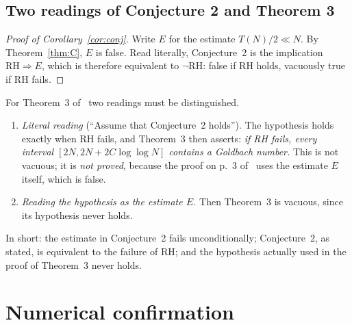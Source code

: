 \documentclass[11pt]{amsart}
\theoremstyle{definition}
\theoremstyle{remark}
\numberwithin{equation}{section}
\newcommand{\Ca}{\cite{Ca}}
\begin{document}
\subsection{Two readings of Conjecture 2 and Theorem 3}\label{sec:readings}
\begin{proof}[Proof of Corollary~\ref{cor:conj}]
Write $E$ for the estimate $T(N)/2\ll N$. By Theorem~\ref{thm:C}, $E$ is false. Read
literally, Conjecture~2 is the implication $\mathrm{RH}\Rightarrow E$, which is therefore
equivalent to $\neg\mathrm{RH}$: false if RH holds, vacuously true if RH fails.
\end{proof}

For Theorem~3 of~\Ca{} two readings must be distinguished.
\begin{enumerate}[label=(\alph*)]
\item \emph{Literal reading} (``Assume that Conjecture~2 holds''). The hypothesis holds
  exactly when RH fails, and Theorem~3 then asserts: \emph{if RH fails, every interval
  $[2N,2N+2C\log\log N]$ contains a Goldbach number.} This is not vacuous; it is
  \emph{not proved}, because the proof on p.~3 of~\Ca{} uses the estimate $E$ itself,
  which is false.
\item \emph{Reading the hypothesis as the estimate $E$.} Then Theorem~3 is vacuous,
  since its hypothesis never holds.
\end{enumerate}
In short: the estimate in Conjecture~2 fails unconditionally; Conjecture~2, as stated, is
equivalent to the failure of RH; and the hypothesis actually used in the proof of
Theorem~3 never holds.

\section{Numerical confirmation}\label{sec:numerics}
\end{document}
